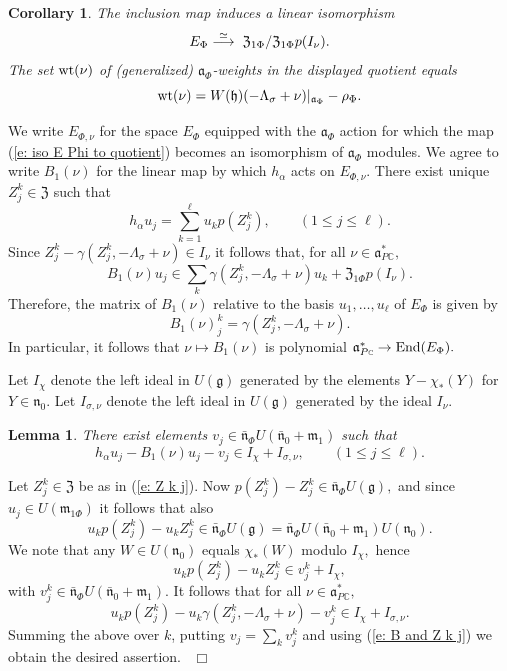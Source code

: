 \documentclass[12pt,a4paper]{article}
\newtheorem{Cor}[Thm]{Corollary}
\newtheorem{Lemma}[Thm]{Lemma}
\newenvironment{cor}[0]{\begin{Cor}\noindent}%
{\end{Cor}}
\newenvironment{lemma}[0]{\begin{Lemma}\noindent}%
{\end{Lemma}}
\def\proof{\par\noindent{\it Proof.}{\ }{\ }}
\def\qed{~\hfill\hbox{$\Box$}\medbreak}
\def\qquad{\quad\quad}
\def\msy#1{{\mathbb #1}}
\def\C{{\msy C}}
\def\ga{\alpha}
\def\gg{\gamma}
\def\gs{\sigma}
\def\got#1{\mathfrak #1}
\def\fa{{\got a}}
\def\fg{{\got g}}
\def\fh{{\got h}}
\def\fm{{\got m}}
\def\fn{{\got n}}
\def\to{\rightarrow}
\def\End{{\rm End}}
\def\iC{{\scriptscriptstyle \C}}
\numberwithin{Thm}{section}
\numberwithin{equation}{section}
\def\fZ{{\mathfrak Z}}
\def\faPdc{{\fa_{P\iC}^*}}
\def\gL{\Lambda}
\numberwithin{equation}{section}
\def\fZ{{\mathfrak Z}}
\def\gL{\Lambda}
\def\wt{{\rm wt}}
\def\faPdc{\fa_{P\iC}^*}
\def\fh{{\mathfrak h}}
\def\cchi{\chi}
\begin{document}
\begin{cor} The inclusion map induces a linear isomorphism 
\begin{equation}
\label{e: iso E Phi to quotient}
E_\Phi \;{\buildrel  \simeq \over \longrightarrow}\;\;\fZ_{1\Phi}/\fZ_{1\Phi} p(I_{\nu}).
\end{equation}
The set $\wt(\nu)$ of (generalized) $\fa_\Phi$-weights in the displayed quotient equals 
$$ 
\wt(\nu) = W(\fh)(-\gL_\gs + \nu)|_{\fa_\Phi }- \rho_\Phi.
$$ 
\end{cor}

We write $E_{\Phi,\nu}$ for the space $E_\Phi$ equipped with the $\fa_\Phi$ action 
for which the map (\ref{e: iso E Phi to quotient}) becomes an isomorphism 
of $\fa_\Phi$ modules. We agree to write $B_1(\nu)$ for the linear map  
by which $h_\ga$ acts on $E_{\Phi, \nu}.$ 
There exist unique $Z^k_j \in \fZ$ such that 
\begin{equation}
\label{e: Z k j}
h_\ga u_j = \sum_{k = 1}^\ell u_k p(Z^k_j), \qquad (1 \leq j \leq \ell).
\end{equation}
Since $Z^k_j - \gg(Z^k_j, -\gL_\gs + \nu)\in I_{\nu}$ it follows that, for all $\nu \in \faPdc,$ 
$$ 
B_1(\nu) u_j  \in  \sum_k \gg(Z^k_j, - \gL_\gs + \nu)u_k + \fZ_{1\Phi} p(I_\nu).
$$ 
Therefore, the matrix of $B_1(\nu)$ relative to the basis $u_1, \ldots, u_\ell$ of $E_\Phi$ 
is given by 
\begin{equation}
\label{e: B and Z k j}
B_1(\nu )_j^k = \gg(Z^k_j, -\gL_\gs + \nu).
\end{equation} 
In particular, it follows that $\nu \mapsto B_1(\nu)$ is polynomial $\faPdc \to \End(E_\Phi).$ 

Let $I_\cchi$ denote the left ideal in $U(\fg)$ generated by the elements $Y - \cchi_*(Y)$ 
for $Y \in \fn_0.$ Let $I_{\gs, \nu}$ denote the left ideal in $U(\fg)$ generated by the 
ideal $I_\nu$. 

\begin{lemma}
There exist  elements $v_j \in \bar \fn_\Phi U(\bar \fn_0 + \fm_{1})$ such that
$$ 
h_\ga u_j-  B_1(\nu) u_j  - v_j \in I_\cchi + I_{\gs, \nu},\qquad (1 \leq j \leq \ell).
$$ 
\end{lemma}

\proof
Let $Z_j^k \in \fZ$ be as in (\ref{e: Z k j}). 
Now $p(Z_j^k) - Z_j^k \in \bar \fn_\Phi U(\fg),$ 
and since $u_j \in U(\fm_{1\Phi})$ it follows that also 
$$
u_k p(Z_j^k) - u_k Z_j^k \in \bar \fn_\Phi U(\fg) = \bar \fn_\Phi U(\bar \fn_0 + \fm_{1})U(\fn_0).
$$ 
We note that any $W \in U(\fn_0)$ equals $\cchi_*(W)$ modulo $I_\cchi,$ hence 
$$ 
u_k p(Z_j^k) - u_k Z_j^k  \in  v_j^k + I_\cchi,
$$ 
with $v_j^k \in \bar \fn_\Phi U(\bar \fn_0 + \fm_{1}).$ It follows that for all 
$\nu \in \faPdc,$ 
$$ 
u_k p(Z_j^k) - u_k \gg(Z_j^k, - \gL_\gs + \nu) - v_j^ k \in I_\cchi + I_{\gs, \nu}.
$$ 
Summing the above over $k$, putting $v_j = \sum_k v^k_j$ and using 
(\ref{e: B and Z k j}) we obtain the desired assertion.
\qed
\end{document}
